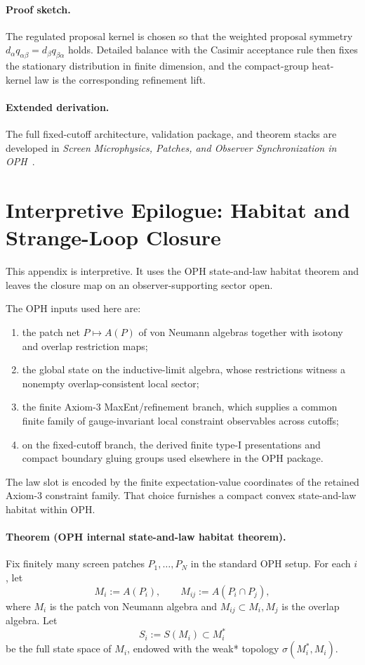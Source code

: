 \paragraph{Proof sketch.}
The regulated proposal kernel is chosen so that the weighted proposal symmetry
\(d_\alpha q_{\alpha\beta}=d_\beta q_{\beta\alpha}\) holds. Detailed balance with the Casimir
acceptance rule then fixes the stationary distribution in finite dimension, and the compact-group
heat-kernel law is the corresponding refinement lift.

\paragraph{Extended derivation.}
The full fixed-cutoff architecture, validation package, and theorem stacks are developed in
\emph{Screen Microphysics, Patches, and Observer Synchronization in OPH}~\cite{ophmicrophysics}.

\section{Interpretive Epilogue: Habitat and Strange-Loop Closure}

This appendix is interpretive. It uses the OPH state-and-law habitat theorem and leaves the
closure map on an observer-supporting sector open.

The OPH inputs used here are:
\begin{enumerate}
\item the patch net \(P\mapsto A(P)\) of von Neumann algebras together with isotony and overlap
restriction maps;
\item the global state on the inductive-limit algebra, whose restrictions witness a nonempty
overlap-consistent local sector;
\item the finite Axiom-3 MaxEnt/refinement branch, which supplies a common finite family of
gauge-invariant local constraint observables across cutoffs;
\item on the fixed-cutoff branch, the derived finite type-I presentations and compact boundary
gluing groups used elsewhere in the OPH package.
\end{enumerate}

The law slot is encoded by the finite expectation-value coordinates of the retained Axiom-3
constraint family. That choice furnishes a compact convex state-and-law habitat within OPH.

\paragraph{Theorem (OPH internal state-and-law habitat theorem).}
Fix finitely many screen patches \(P_1,\dots,P_N\) in the standard OPH setup. For each \(i\), let
\[
M_i:=A(P_i),
\qquad
M_{ij}:=A(P_i\cap P_j),
\]
where \(M_i\) is the patch von Neumann algebra and \(M_{ij}\subset M_i,M_j\) is the overlap
algebra. Let
\[
S_i:=S(M_i)\subset M_i^*
\]
be the full state space of \(M_i\), endowed with the weak* topology \(\sigma(M_i^*,M_i)\).

